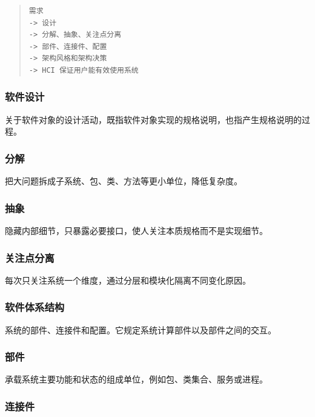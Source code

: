 \documentclass[UTF8,zihao=-4]{ctexart}
\begin{document}
\begin{quote}
\footnotesize
\begin{verbatim}
需求
-> 设计
-> 分解、抽象、关注点分离
-> 部件、连接件、配置
-> 架构风格和架构决策
-> HCI 保证用户能有效使用系统
\end{verbatim}
\end{quote}


\subsubsection*{软件设计}


关于软件对象的设计活动，既指软件对象实现的规格说明，也指产生规格说明的过程。


\subsubsection*{分解}


把大问题拆成子系统、包、类、方法等更小单位，降低复杂度。


\subsubsection*{抽象}


隐藏内部细节，只暴露必要接口，使人关注本质规格而不是实现细节。


\subsubsection*{关注点分离}


每次只关注系统一个维度，通过分层和模块化隔离不同变化原因。


\subsubsection*{软件体系结构}


系统的部件、连接件和配置。它规定系统计算部件以及部件之间的交互。


\subsubsection*{部件}


承载系统主要功能和状态的组成单位，例如包、类集合、服务或进程。


\subsubsection*{连接件}
\end{document}
